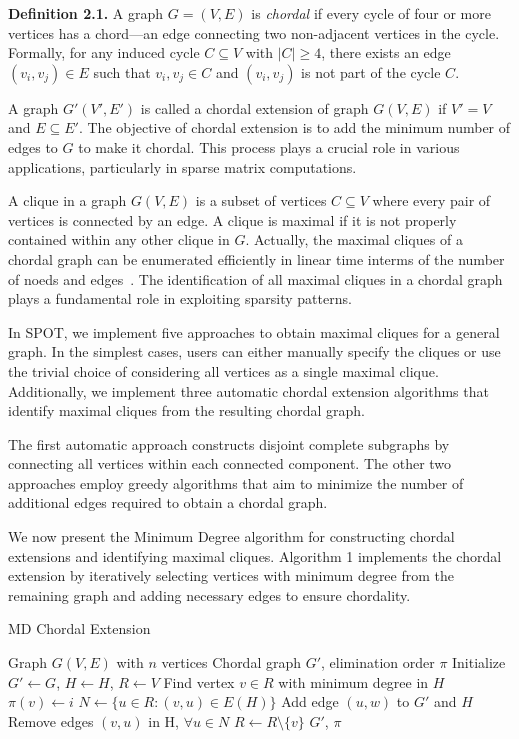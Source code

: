 \textbf{Definition 2.1.} A graph $G = (V, E)$ is \emph{chordal} if every cycle of four or more vertices has a chord—an edge connecting two non-adjacent vertices in the cycle. Formally, for any induced cycle $C \subseteq V$ with $|C| \geq 4$, there exists an edge $(v_i, v_j) \in E$ such that $v_i, v_j \in C$ and $(v_i, v_j)$ is not part of the cycle $C$.

A graph $G'(V', E')$ is called a chordal extension of graph $G(V, E)$ if $V' = V$ and $E\subseteq E'$. The objective of chordal extension is to add the minimum number of edges to $G$ to make it chordal. This process plays a crucial role in various applications, particularly in sparse matrix computations.

A clique in a graph $G(V, E)$ is a subset of vertices $C \subseteq V$ where every pair of vertices is connected by an edge. 
A clique is maximal if it is not properly contained within any other clique in $G$. Actually, the maximal cliques of a chordal graph can be enumerated efficiently in linear time interms of the number of noeds and edges~\cite{Delbert1965pjm-matrix-and-graph, Hans2010iac-treewidth-computations, golumbic2004algorithmic}. 
The identification of all maximal cliques in a chordal graph plays a fundamental role in exploiting sparsity patterns.

In SPOT, we implement five approaches to obtain maximal cliques for a general graph. In the simplest cases, users can either manually specify the cliques or use the trivial choice of considering all vertices as a single maximal clique. Additionally, we implement three automatic chordal extension algorithms that identify maximal cliques from the resulting chordal graph.

The first automatic approach constructs disjoint complete subgraphs by connecting all vertices within each connected component. The other two approaches employ greedy algorithms that aim to minimize the number of additional edges required to obtain a chordal graph.

We now present the Minimum Degree algorithm for constructing chordal extensions and identifying maximal cliques. Algorithm 1 implements the chordal extension by iteratively selecting vertices with minimum degree from the remaining graph and adding necessary edges to ensure chordality. 

\begin{algorithm}
	\small
	\caption{MD Chordal Extension}
	\begin{algorithmic}[1]
	\REQUIRE Graph $G(V,E)$ with $n$ vertices
	\ENSURE Chordal graph $G'$, elimination order $\pi$
	\STATE Initialize $G' \leftarrow G$, $H \leftarrow H$, $R \leftarrow V$
		\STATE Find vertex $v \in R$ with minimum degree in $H$
		\STATE $\pi(v) \leftarrow i$
		\STATE $N \leftarrow \{u \in R : (v,u) \in E(H)\}$ 
				\STATE Add edge $(u,w)$ to $G'$ and $H$
				\STATE Remove edges $(v, u)$ in H, $\forall u \in N$
			\ENDIF
		\ENDFOR
		\STATE $R \leftarrow R \setminus \{v\}$
	\ENDFOR
	\RETURN $G'$, $\pi$
	\end{algorithmic}		
\end{algorithm}

